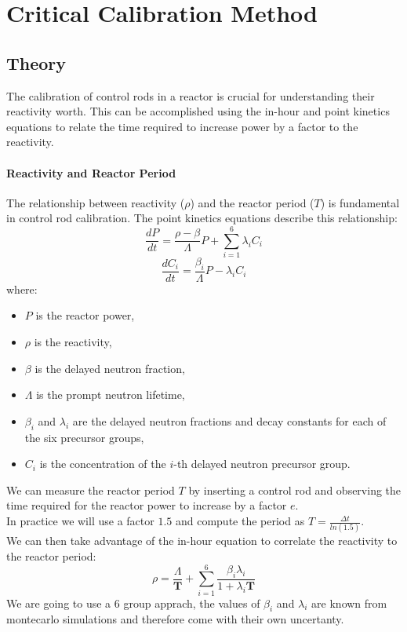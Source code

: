 \section{Critical Calibration Method}

\subsection{Theory}
The calibration of control rods in a reactor is crucial for understanding their reactivity worth. This can be accomplished using the in-hour and point kinetics equations to relate the time required to increase power by a factor to the reactivity.

\paragraph{Reactivity and Reactor Period}
The relationship between reactivity ($\rho$) and the reactor period ($T$) is fundamental in control rod calibration. The point kinetics equations describe this relationship:
\begin{equation}
    \frac{dP}{dt} = \frac{\rho - \beta}{\Lambda}P + \sum_{i=1}^6 \lambda_i C_i
\end{equation}
\begin{equation}
    \frac{dC_i}{dt} = \frac{\beta_i}{\Lambda}P - \lambda_i C_i
\end{equation}
where:
\begin{itemize}
    \item $P$ is the reactor power,
    \item $\rho$ is the reactivity,
    \item $\beta$ is the delayed neutron fraction,
    \item $\Lambda$ is the prompt neutron lifetime,
    \item $\beta_i$ and $\lambda_i$ are the delayed neutron fractions and decay constants for each of the six precursor groups,
    \item $C_i$ is the concentration of the $i$-th delayed neutron precursor group.
\end{itemize}

We can measure the reactor period $T$ by inserting a control rod and observing the time required for the reactor power to increase by a factor $e$. \\
In practice we will use a factor $1.5$ and compute the period as $T = \frac{\Delta t}{ln(1.5)}$. \\
We can then take advantage of the in-hour equation to correlate the reactivity to the reactor period:
\begin{equation}
    \rho = \frac{\Lambda}{\mathbf{T}} + \sum_{i=1}^6 \frac{\beta_i \lambda_i}{1 + \lambda_i \mathbf{T}}
\end{equation}
We are going to use a 6 group apprach, the values of $\beta_i$ and $\lambda_i$ are known from montecarlo simulations and therefore come with their own uncertanty.


